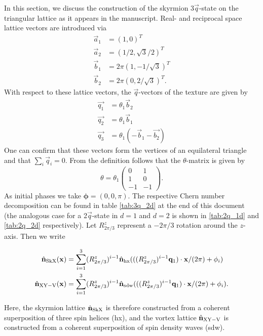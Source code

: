 \documentclass[
    10pt,
    aps,
    prb,
    twocolumn,
    floatfix,
    superscriptaddress,
]{revtex4-2}
\begin{document}
In this section, we discuss the construction of the skyrmion $3\vec{q}$-state on the triangular lattice as it appears in the manuscript.
Real- and reciprocal space lattice vectors are introduced via
\begin{align}
	\vec{a}_1 &= (1,0)^T
	\\
	\vec{a}_2 &= (1/2,\sqrt{3}/2 )^T
	\\
	\vec{b}_1 &= 2 \pi (1, -1/\sqrt{3})^T
	\\
	\vec{b}_2 &= 2 \pi (0, 2 / \sqrt{3})^T .
\end{align}
With respect to these lattice vectors, the $\vec{q}$-vectors of the texture are given by
\begin{align}
	\vec{q_1} &= \theta_1 \vec{b}_2 \\
	\vec{q_2} &= \theta_1\vec{b}_1 \\ 
	\vec{q_3} &= \theta_1(-\vec{b}_1- \vec{b_2}) 
\end{align}
One can confirm that these vectors form the vertices of an equilateral triangle and that $\sum_i \vec{q}_i = 0$.
From the definition follows that the $\theta$-matrix is given by
\begin{equation}
	\theta =
	\theta_1 
	\begin{pmatrix}
		0 & 1 \\
		1 & 0 \\
		-1 & -1
	\end{pmatrix} .
\end{equation}
As initial phases we take $\boldsymbol{\phi} = (0,0,\pi)$.  
The respective Chern number decomposition can be found in table \ref{tab:3q_2d} at the end of this document (the analogous case for a 2$\vec{q}$-state in $d=1$ and $d=2$ is shown in \ref{tab:2q_1d} and  \ref{tab:2q_2d} respectively).
Let $R^z_{2\pi/3}$ represent a $-2\pi/3$ rotation around the $z$-axis.
Then we write
\begin{widetext}
\begin{align}
	\hat{\mathbf{n}}_\mathrm{SkX}(\mathbf{x}) &=  \sum_{i=1}^{3 } (R^z_{2\pi/3})^{i-1} \hat{\mathbf{n}}_\mathrm{hx} ( ((R^z_{2\pi/3})^{i-1} \mathbf{q}_1 )\cdot \mathbf{x}/ (2\pi) + \phi_i ) 
	\\
	\hat{\mathbf{n}}_\mathrm{XY-V}(\mathbf{x}) &= \sum_{i=1}^{3 } (R^z_{2\pi/3})^{i-1} \hat{\mathbf{n}}_\mathrm{sdw} ( ((R^z_{2\pi/3})^{i-1} \mathbf{q}_1 )\cdot \mathbf{x}/ (2\pi)  + \phi_i ) .
\end{align}
\end{widetext}
Here, the skyrmion lattice $\hat{\mathbf{n}}_\mathrm{SkX}$ is therefore constructed from a coherent superposition of three spin helices (hx), and the vortex lattice $\hat{\mathbf{n}}_\mathrm{XY-V}$ is constructed  from a coherent superposition of spin density waves (sdw).
\end{document}

